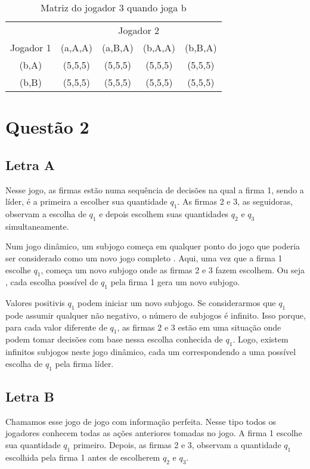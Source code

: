 \documentclass[a4paper,12pt]{article}[abntex2]
\begin{document}
\begin{table}[H]
\centering
\begin{tabular}{|c|c|c|c|c|}
\hline
 & \multicolumn{4}{c|}{Jogador 2} \\ \cline{2-5} 
Jogador 1 & (a,A,A) & (a,B,A) & (b,A,A) & (b,B,A) \\ \hline
(b,A) & (5,5,5) & (5,5,5) & (5,5,5) & (5,5,5) \\ \hline
(b,B) & (5,5,5) & (5,5,5) & (5,5,5) & (5,5,5) \\ \hline
\end{tabular}
\caption{Matriz do jogador 3 quando joga b}
\end{table}


\section{\textbf{Questão 2}}
\subsection{\textbf{Letra A}}
Nesse jogo, as firmas estão numa sequência de decisões na qual a firma 1, sendo a líder, é a primeira a escolher sua quantidade \( q_1 \). As firmas 2 e 3, as seguidoras, observam a escolha de \( q_1 \) e depois escolhem suas quantidades \( q_2 \) e \( q_3 \) simultaneamente.

Num jogo dinâmico, um subjogo começa em qualquer ponto do jogo que poderia ser considerado como um novo jogo completo . Aqui, uma vez que a firma 1 escolhe \( q_1 \), começa um novo subjogo onde as firmas 2 e 3 fazem escolhem. Ou seja , cada escolha possível de \( q_1 \) pela firma 1 gera um novo subjogo.

Valores positivis \( q_1 \) podem iniciar um novo subjogo. Se considerarmos que \( q_1 \) pode assumir qualquer não negativo, o número de subjogos é infinito. Isso  porque, para cada valor diferente de \( q_1 \), as firmas 2 e 3 estão em uma situação onde podem tomar  decisões com base nessa escolha conhecida de \( q_1 \). Logo, existem infinitos subjogos neste jogo dinâmico, cada um correspondendo a uma possível escolha de \( q_1 \) pela firma líder.

\subsection{\textbf{Letra B}}
Chamamos esse jogo de jogo com informação perfeita. Nesse tipo todos os jogadores conhecem todas as ações anteriores tomadas no jogo. A firma 1 escolhe sua quantidade \( q_1 \) primeiro. Depois, as firmas 2 e 3, observam a quantidade \( q_1 \) escolhida pela firma 1 antes de escolherem \( q_2 \) e \( q_3 \). 
\end{document}
